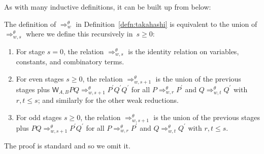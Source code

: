 \documentclass{lmcs} %
\newcommand{\param}{\theta}
\newcommand{\Reduces}[2]{\Rightarrow_{#1}^{#2}}
\newcommand{\ctW}[4]{{\mathsf W}_{#1, #2}#3#4}
\begin{document}
As with many inductive definitions, it can be built up from below:
\begin{prop}
The definition of $\Reduces{w}{\param}$ in Definition~\ref{defn:takahashi} is equivalent to the union of $\Reduces{w,s}{\param}$ where we define this recursively in~$s\geq 0$:
\begin{enumerate}[leftmargin=*]
    \item \label{defn:takahashibelow1} For stage $s=0$, the relation $\Reduces{w,s}{\param}$ is the identity relation on variables, constants, and combinatory terms.
    \item \label{defn:takahashibelow2} For even stages $s\geq 0$, the relation $\Reduces{w,s+1}{\param}$ is the union of the previous stages plus $\ctW{A}{B}{P}{Q}\Reduces{w,s+1}{\param} P^{\prime}Q^{\prime}Q^{\prime}$ for all $P\Reduces{w,r}{\param} P^{\prime}$ and $Q\Reduces{w,t}{\param} Q^{\prime}$ with $r,t\leq s$; and similarly for the other weak reductions.
    \item \label{defn:takahashibelow3} For odd stages $s\geq 0$, the relation $\Reduces{w,s+1}{\param}$ is the union of the previous stages plus $PQ\Reduces{w,s+1}{\param} P^{\prime}Q^{\prime}$ for all $P\Reduces{w,r}{\param} P^{\prime}$ and $Q\Reduces{w,t}{\param} Q^{\prime}$ with $r,t\leq s$.
\end{enumerate}
\end{prop}
The proof is standard and so we omit it.
\end{document}
